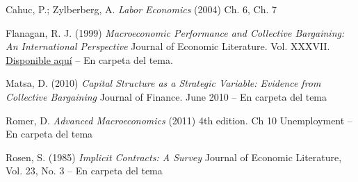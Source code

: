 \documentclass{nuevotema}
\begin{document}
Cahuc, P.; Zylberberg, A. \textit{Labor Economics} (2004) Ch. 6, Ch. 7

Flanagan, R. J. (1999) \textit{Macroeconomic Performance and Collective Bargaining: An International Perspective} Journal of Economic Literature. Vol. XXXVII. \href{https://pubs.aeaweb.org/doi/pdfplus/10.1257/jel.37.3.1150}{Disponible aquí} -- En carpeta del tema. 

Matsa, D. (2010) \textit{Capital Structure as a Strategic Variable: Evidence from Collective Bargaining} Journal of Finance. June 2010 -- En carpeta del tema

Romer, D. \textit{Advanced Macroeconomics} (2011) 4th edition. Ch 10 Unemployment -- En carpeta del tema

Rosen, S. (1985) \textit{Implicit Contracts: A Survey} Journal of Economic Literature, Vol. 23, No. 3 -- En carpeta del tema
\end{document}
